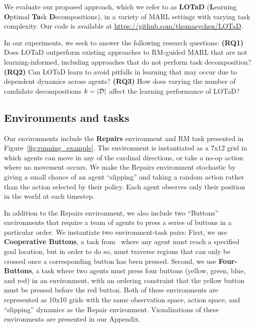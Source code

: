 We evaluate our proposed approach, which we refer to as \textbf{LOTaD} (\textbf{L}earning \textbf{O}ptimal \textbf{Ta}sk \textbf{D}ecompositions), in a variety of MARL settings with varying task complexity. Our code is available at \href{https://github.com/thomasychen/LOTaD}{https://github.com/thomasychen/LOTaD}.

In our experiments, we seek to answer the following research questions: \textbf{(RQ1)} Does LOTaD outperform existing approaches to RM-guided MARL that are not learning-informed, including approaches that do not perform task decomposition? \textbf{(RQ2)} Can LOTaD learn to avoid pitfalls in learning that may occur due to dependent dynamics across agents? \textbf{(RQ3)} How does varying the number of candidate decompositions $k = |\mathcal{D}|$ affect the learning performance of LOTaD?

\subsection{Environments and tasks}

Our environments include the \textbf{Repairs} environment and RM task presented in Figure~\ref{fig:running_example}. The environment is instantiated as a 7x12 grid in which agents can move in any of the cardinal directions, or take a no-op action where no movement occurs. We make the Repairs environment stochastic by giving a small chance of an agent ``slipping'' and taking a random action rather than the action selected by their policy. Each agent observes only their position in the world at each timestep.

In addition to the Repairs environment, we also include two ``Buttons'' environments that require a team of agents to press a series of buttons in a particular order. We instantiate two environment-task pairs: First, we use \textbf{Cooperative Buttons}, a task from~\cite{neary2020reward} where any agent must reach a specified goal location, but in order to do so, must traverse regions that can only be crossed once a corresponding button has been pressed. Second, we use \textbf{Four-Buttons}, a task where two agents must press four buttons (yellow, green, blue, and red) in an environment, with an ordering constraint that the yellow button must be pressed before the red button. Both of these environments are represented as 10x10 grids with the same observation space, action space, and ``slipping'' dynamics as the Repair environment. Visualizations of these environments are presented in our Appendix.

